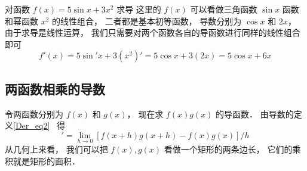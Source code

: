 \begin{example}{对函数 $f(x) = 5\sin x + 3x^2$ 求导}
这里的 $f(x)$ 可以看做三角函数 $\sin x$ 函数和幂函数 $x^2$ 的线性组合， 二者都是基本初等函数， 导数分别为 $\cos x$ 和 $2x$， 由于求导是线性运算， 我们只需要对两个函数各自的导函数进行同样的线性组合即可
\begin{equation}
f'(x) = 5 \sin' x + 3(x^2)' = 5 \cos x + 3(2x) = 5\cos x + 6x
\end{equation}
\end{example}

\subsection{两函数相乘的导数}
令两函数分别为 $f(x)$ 和 $g(x)$， 现在求 $f(x) g(x)$ 的导函数． 由导数的定义\autoref{Der_eq2}~ 得
\begin{equation}
[f(x)g(x)]' = \lim_{h\to 0} [f(x+h)g(x+h) - f(x)g(x)]/h
\end{equation}
从几何上来看， 我们可以把 $f(x), g(x)$ 看做一个矩形的两条边长， 它们的乘积就是矩形的面积．

